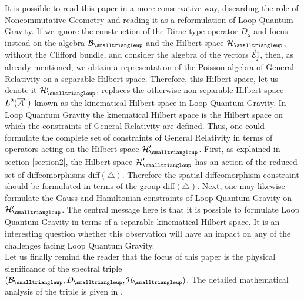 \documentclass[12pt]{article}
\def\ca{{\cal A}}
\def\cb{{\cal B}}
\def\ce{{\cal E}}
\def\ch{{\cal H}}
\begin{document}
It is possible to read this paper in a more conservative way, discarding the role of Noncommutative Geometry and reading it as a reformulation of Loop Quantum Gravity. If we ignore the construction of the Dirac type operator $D_{\smalltriangleup}$ and focus instead on the algebra $\cb_{\smalltriangleup}$ and the Hilbert space $\ch_{\smalltriangleup}$, without the Clifford bundle, and consider the algebra of the vectors $\hat{\ce}^i_j$, then, as already mentioned, we obtain a representation of the Poisson algebra of General Relativity on a separable Hilbert space. Therefore, this Hilbert space, let us denote it $\ch_{\smalltriangleup}'$, replaces the otherwise non-separable Hilbert space $L^2(\overline{\ca}^{\small a})$ known as the kinematical Hilbert space in Loop Quantum Gravity. In Loop Quantum Gravity the kinematical Hilbert space is the Hilbert space on which the constraints of General Relativity are defined. Thus, one could formulate the complete set of constraints of General Relativity in terms of operators acting on the Hilbert space $\ch_{\smalltriangleup}'$. First, as explained in section \ref{section2}, the Hilbert space $\ch_{\smalltriangleup}'$ has an action of the reduced set of diffeomorphisms diff$(\triangle)$. Therefore the spatial diffeomorphism constraint should be formulated in terms of the group diff$(\triangle)$. Next, one may likewise formulate the Gauss and Hamiltonian constraints of Loop Quantum Gravity on $\ch_{\smalltriangleup}'$. The central message here is that it is possible to formulate Loop Quantum Gravity in terms of a separable kinematical Hilbert space. It is an interesting question whether this observation will have an impact on any of the challenges facing Loop Quantum Gravity.\\




Let us finally remind the reader that the focus of this paper is the physical significance of the spectral triple $(\cb_{\smalltriangleup},D_{\smalltriangleup},\ch_\smalltriangleup)$. The detailed mathematical analysis of the triple is given in \cite{Aastrup}.\\


\\
\end{document}
